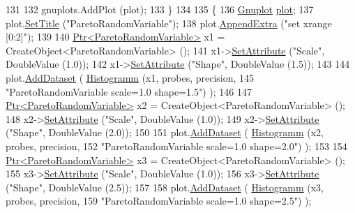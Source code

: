 \begin{DoxyCode}
131 
132     gnuplots.AddPlot (plot);
133   \}
134 
135   \{
136     \hyperlink{classns3_1_1Gnuplot}{Gnuplot} \hyperlink{lte__amc_8m_a5942306abe9f005572e4344e3cdef528}{plot};
137     plot.\hyperlink{classns3_1_1Gnuplot_ac01f15633d49f0239f8a45293a1e04f0}{SetTitle} (\textcolor{stringliteral}{"ParetoRandomVariable"});
138     plot.\hyperlink{classns3_1_1Gnuplot_a649a3041b9d0ea21a212b5ad9b28ecbf}{AppendExtra} (\textcolor{stringliteral}{"set xrange [0:2]"});
139 
140     \hyperlink{classns3_1_1Ptr}{Ptr<ParetoRandomVariable>} x1 = CreateObject<ParetoRandomVariable> ();
141     x1->\hyperlink{classns3_1_1ObjectBase_ac60245d3ea4123bbc9b1d391f1f6592f}{SetAttribute} (\textcolor{stringliteral}{"Scale"}, DoubleValue (1.0));
142     x1->\hyperlink{classns3_1_1ObjectBase_ac60245d3ea4123bbc9b1d391f1f6592f}{SetAttribute} (\textcolor{stringliteral}{"Shape"}, DoubleValue (1.5));
143 
144     plot.\hyperlink{classns3_1_1Gnuplot_a306ec724a327cf9ab699700f31fca0a1}{AddDataset} ( \hyperlink{main-random-variable_8cc_a2cfd3837ab3f2e816cf53486d7a186b5}{Histogramm} (x1, probes, precision,
145                                   \textcolor{stringliteral}{"ParetoRandomVariable scale=1.0 shape=1.5"}) );
146 
147     \hyperlink{classns3_1_1Ptr}{Ptr<ParetoRandomVariable>} x2 = CreateObject<ParetoRandomVariable> ();
148     x2->\hyperlink{classns3_1_1ObjectBase_ac60245d3ea4123bbc9b1d391f1f6592f}{SetAttribute} (\textcolor{stringliteral}{"Scale"}, DoubleValue (1.0));
149     x2->\hyperlink{classns3_1_1ObjectBase_ac60245d3ea4123bbc9b1d391f1f6592f}{SetAttribute} (\textcolor{stringliteral}{"Shape"}, DoubleValue (2.0));
150 
151     plot.\hyperlink{classns3_1_1Gnuplot_a306ec724a327cf9ab699700f31fca0a1}{AddDataset} ( \hyperlink{main-random-variable_8cc_a2cfd3837ab3f2e816cf53486d7a186b5}{Histogramm} (x2, probes, precision,
152                                   \textcolor{stringliteral}{"ParetoRandomVariable scale=1.0 shape=2.0"}) );
153 
154     \hyperlink{classns3_1_1Ptr}{Ptr<ParetoRandomVariable>} x3 = CreateObject<ParetoRandomVariable> ();
155     x3->\hyperlink{classns3_1_1ObjectBase_ac60245d3ea4123bbc9b1d391f1f6592f}{SetAttribute} (\textcolor{stringliteral}{"Scale"}, DoubleValue (1.0));
156     x3->\hyperlink{classns3_1_1ObjectBase_ac60245d3ea4123bbc9b1d391f1f6592f}{SetAttribute} (\textcolor{stringliteral}{"Shape"}, DoubleValue (2.5));
157 
158     plot.\hyperlink{classns3_1_1Gnuplot_a306ec724a327cf9ab699700f31fca0a1}{AddDataset} ( \hyperlink{main-random-variable_8cc_a2cfd3837ab3f2e816cf53486d7a186b5}{Histogramm} (x3, probes, precision,
159                                   \textcolor{stringliteral}{"ParetoRandomVariable scale=1.0 shape=2.5"}) );

\end{DoxyCode}
